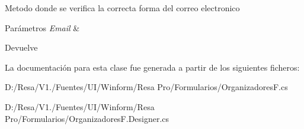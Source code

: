 Metodo donde se verifica la correcta forma del correo electronico 


\begin{DoxyParams}{Parámetros}
{\em Email} & \\
\hline
\end{DoxyParams}
\begin{DoxyReturn}{Devuelve}

\end{DoxyReturn}


La documentación para esta clase fue generada a partir de los siguientes ficheros\+:\begin{DoxyCompactItemize}
\item 
D\+:/\+Resa/\+V1./\+Fuentes/\+U\+I/\+Winform/\+Resa Pro/\+Formularios/Organizadores\+F.\+cs\item 
D\+:/\+Resa/\+V1./\+Fuentes/\+U\+I/\+Winform/\+Resa Pro/\+Formularios/Organizadores\+F.\+Designer.\+cs\end{DoxyCompactItemize}
